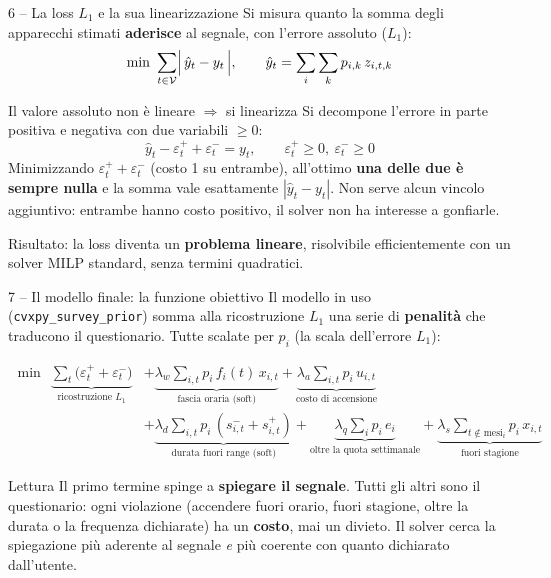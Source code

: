 \documentclass[aspectratio=169]{beamer}
\newcommand{\code}[1]{\texttt{\small #1}}
\newcommand{\ep}{\varepsilon^{+}}
\newcommand{\en}{\varepsilon^{-}}
\begin{document}
\begin{frame}{6 -- La loss $L_1$ e la sua linearizzazione}
  Si misura quanto la somma degli apparecchi stimati \textbf{aderisce} al segnale, con l'errore
  assoluto ($L_1$):
  \[
    \min \ \sum_{t \in \mathcal{V}} \Bigl|\, \hat{y}_t - y_t \,\Bigr|,
    \qquad \hat{y}_t = \sum_i \sum_k p_{i,k}\, z_{i,t,k}
  \]

  \begin{block}{Il valore assoluto non \`e lineare $\Rightarrow$ si linearizza}
    Si decompone l'errore in parte positiva e negativa con due variabili $\ge 0$:
    \[
      \hat{y}_t - \ep_t + \en_t = y_t, \qquad \ep_t \ge 0,\ \en_t \ge 0
    \]
    Minimizzando $\ep_t + \en_t$ (costo 1 su entrambe), all'ottimo \textbf{una delle due \`e sempre
    nulla} e la somma vale esattamente $|\hat{y}_t - y_t|$. Non serve alcun vincolo aggiuntivo:
    entrambe hanno costo positivo, il solver non ha interesse a gonfiarle.
  \end{block}

  \vspace{0.2em}
  \small\color{CorpGray}
  Risultato: la loss diventa un \textbf{problema lineare}, risolvibile efficientemente con un solver
  MILP standard, senza termini quadratici.
\end{frame}

\begin{frame}{7 -- Il modello finale: la funzione obiettivo}
  Il modello in uso (\code{cvxpy\_survey\_prior}) somma alla ricostruzione $L_1$ una serie di
  \textbf{penalit\`a} che traducono il questionario. Tutte scalate per $p_i$ (la scala dell'errore $L_1$):

  \vspace{-0.2em}
  {\small
  \begin{align*}
    \min\ \ \underbrace{\sum_{t}\bigl(\ep_t + \en_t\bigr)}_{\text{ricostruzione } L_1}
    &+ \underbrace{\lambda_w \sum_{i,t} p_i\, f_i(t)\, x_{i,t}}_{\text{fascia oraria (soft)}}
     + \underbrace{\lambda_a \sum_{i,t} p_i\, u_{i,t}}_{\text{costo di accensione}} \\[0.3em]
    &+ \underbrace{\lambda_d \sum_{i,t} p_i\,(s^-_{i,t}+s^+_{i,t})}_{\text{durata fuori range (soft)}}
     + \underbrace{\lambda_q \sum_i p_i\, e_i}_{\text{oltre la quota settimanale}}
     + \underbrace{\lambda_s \!\!\sum_{t \notin \text{mesi}_i}\!\! p_i\, x_{i,t}}_{\text{fuori stagione}}
  \end{align*}}

  \vspace{-0.2em}
  \begin{block}{Lettura}
    \small
    Il primo termine spinge a \textbf{spiegare il segnale}. Tutti gli altri sono il questionario:
    ogni violazione (accendere fuori orario, fuori stagione, oltre la durata o la frequenza
    dichiarate) ha un \textbf{costo}, mai un divieto. Il solver cerca la spiegazione pi\`u aderente
    al segnale \emph{e} pi\`u coerente con quanto dichiarato dall'utente.
  \end{block}
\end{frame}
\end{document}
